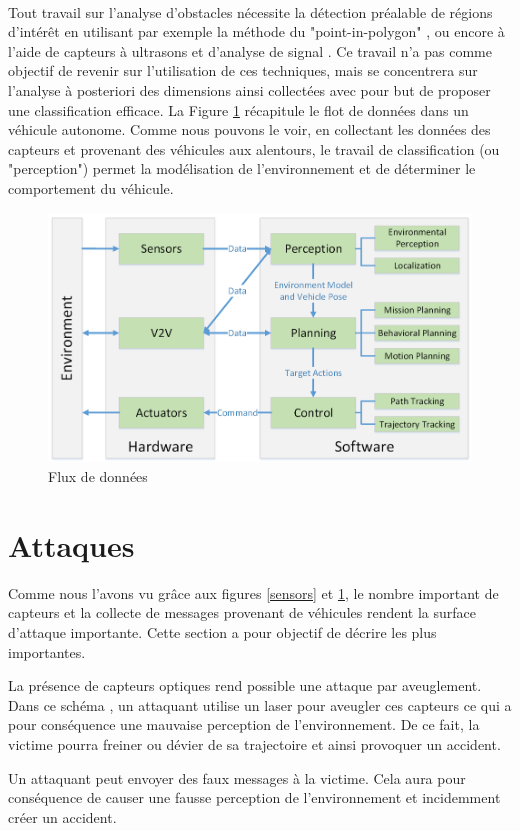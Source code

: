\documentclass[a4paper]{report}
\begin{document}
~\par

Tout travail sur l'analyse d'obstacles nécessite la détection préalable de régions d'intérêt en utilisant par exemple la méthode du "point-in-polygon" \cite{ref1}, ou encore à l'aide de capteurs à ultrasons et d'analyse de signal \cite{ref2}. Ce travail n'a pas comme objectif de revenir sur l'utilisation de ces techniques, mais se concentrera sur l'analyse à posteriori des dimensions ainsi collectées avec pour but de proposer une classification efficace. La Figure \ref{data_flow} récapitule le flot de données dans un véhicule autonome. Comme nous pouvons le voir, en collectant les données des capteurs et provenant des véhicules aux alentours, le travail de classification (ou "perception") permet la modélisation de l'environnement et de déterminer le comportement du véhicule.

\begin{figure}
\centering
\includegraphics[width=\textwidth]{img/data_flow.png}
\caption{Flux de données\label{data_flow}}
\end{figure}

\section{Attaques}

Comme nous l'avons vu grâce aux figures \ref{sensors} et \ref{data_flow}, le nombre important de capteurs et la collecte de messages provenant de véhicules rendent la surface d'attaque importante. Cette section a pour objectif de décrire les plus importantes.

\begin{description}\setlength{\itemsep}{1.5mm}
\item[Attaque par aveuglement des capteurs] La présence de capteurs optiques rend possible une attaque par aveuglement. Dans ce schéma \cite{blinding}, un attaquant utilise un laser pour aveugler ces capteurs ce qui a pour conséquence une mauvaise perception de l'environnement. De ce fait, la victime pourra freiner ou dévier de sa trajectoire et ainsi provoquer un accident. 
\item[Attaque par modification] Un attaquant peut envoyer des faux messages à la victime. Cela aura pour conséquence de causer une fausse perception de l'environnement et incidemment créer un accident.
\end{description}
\end{document}
